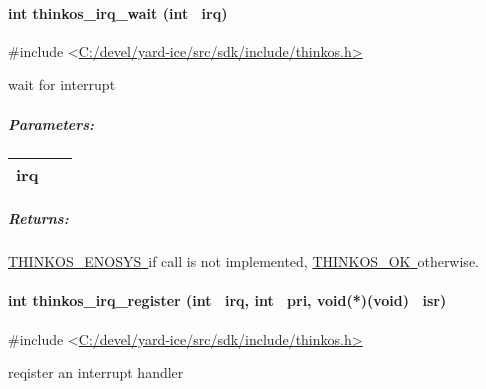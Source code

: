 {\paragraph{\texorpdfstring{{int thinkos\_irq\_wait (int
~irq)}}{int thinkos\_irq\_wait (int ~irq)}}\label{int-thinkos_irq_wait-int-irq}

{}

{\#include
\textless{}}{\protect\hyperlink{h.pkwqa1}{C:/devel/yard-ice/src/sdk/include/thinkos.h}}{\protect\hyperlink{h.pkwqa1}{\textgreater{}}}

{wait for interrupt }

{}

\subparagraph{\texorpdfstring{{Parameters:}}{Parameters:}}\label{parameters-48}

\protect\hypertarget{t.c2957ce4f831c006182672b15100a2a6a33851a6}{}{}\protect\hypertarget{t.49}{}{}

\begin{longtable}[]{@{}ll@{}}
\toprule
\begin{minipage}[t]{0.47\columnwidth}\raggedright\strut
{irq}{~}\strut
\end{minipage} & \begin{minipage}[t]{0.47\columnwidth}\raggedright\strut
{}\strut
\end{minipage}\tabularnewline
\bottomrule
\end{longtable}

\subparagraph{\texorpdfstring{{Returns:}}{Returns:}}\label{returns-50}

{\protect\hyperlink{h.3s49zyc}{THINKOS\_ENOSYS}}{\protect\hyperlink{h.3s49zyc}{~}}{if
call is not implemented,
}{\protect\hyperlink{h.2fk6b3p}{THINKOS\_OK}}{\protect\hyperlink{h.2fk6b3p}{~}}{otherwise.
}

\paragraph{\texorpdfstring{{int thinkos\_irq\_register (int ~irq, int
~pri, void(*)(void)
~isr)}}{int thinkos\_irq\_register (int ~irq, int ~pri, void(*)(void) ~isr)}}\label{int-thinkos_irq_register-int-irq-int-pri-voidvoid-isr}

{}

{\#include
\textless{}}{\protect\hyperlink{h.pkwqa1}{C:/devel/yard-ice/src/sdk/include/thinkos.h}}{\protect\hyperlink{h.pkwqa1}{\textgreater{}}}

{reqister an interrupt handler }

{}

}
